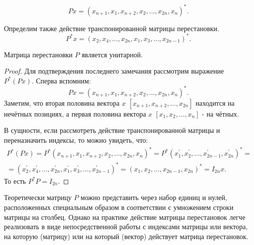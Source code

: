 \begin{equation}
    Px=(x_{n+1},x_1, x_{n+2},x_2,\dots,x_{2n},x_n)^*.
\end{equation}
\begin{note}
    Определим также действие транспонированной матрицы перестановки.
    \begin{equation}
        P^*x=(x_2,x_4,\dots,x_{2n},x_1,x_3,\dots,x_{2n-1})^*.
    \end{equation}
\end{note}

\begin{claim} \label{P-unitary}
    Матрица перестановки \(P\) является унитарной.
\end{claim}
\begin{proof}
    Для подтверждения последнего замечания рассмотрим выражение \(P^*(Px)\). Сперва вспомним: 
    \begin{equation}
        Px=(x_{n+1},x_1, x_{n+2},x_2,\dots,x_{2n},x_n)^*.
    \end{equation}
    Заметим, что вторая половина вектора \(x\) \([x_{n+1},x_{n+2},\dots,x_{2n}]\) находится на нечётных позициях, а первая половина вектора  \(x\) \([x_{1},x_{2},\dots,x_{n}]\) - на чётных. 

    В сущности, если рассмотреть действие транспонированной матрицы и переназначить индексы, то можно увидеть, что:
    \begin{equation*}
        \begin{split}
            P^*(Px)=P^*(x_{n+1},x_1, x_{n+2},x_2,\dots,x_{2n},x_n)^*=P^*(x_{1}^\prime,x_2^\prime,\dots,x_{2n-1}^\prime,x_{2n}^\prime)^*=\\[6pt]=(x_2^\prime,x_4^\prime,\dots,x_{2n}^\prime,x_1^\prime,x_3^\prime,\dots,x_{2n-1}^\prime)^*=(x_{1},x_2,\dots,x_{2n-1},x_{2n})^*=I_{2n}x. 
        \end{split}
    \end{equation*}
    То есть \(P^*P=I_{2n}\).
\end{proof}

\begin{note}
    Теоретически матрицу $P$ можно представить через набор единиц и нулей, расположенных специальным образом в соответствии с умножением строки матрицы на столбец. Однако на практике действие матрицы перестановок легче реализовать в виде непосредственной работы с индексами матрицы или вектора, на которую (матрицу) или на который (вектор) действует матрица перестановок.   
\end{note}

